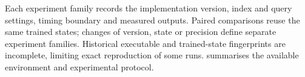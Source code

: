 Each experiment family records the implementation version, index and query
settings, timing boundary and measured outputs. Paired comparisons reuse
the same trained states; changes of version, state or precision define
separate experiment families. Historical executable and trained-state
fingerprints are incomplete, limiting exact reproduction of some runs.
 summarises the available environment and
experimental protocol.
